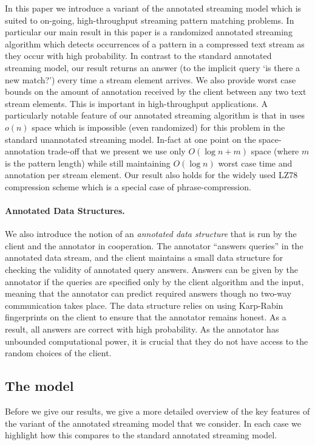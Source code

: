 In this paper we introduce a variant of the annotated streaming model which is suited to on-going, high-throughput streaming pattern matching problems. In particular our main result in this paper is a randomized annotated streaming algorithm which detects occurrences of a pattern in a compressed text stream as they occur with high probability. In contrast to the standard annotated streaming model, our result returns an answer (to the implicit query `is there a new match?') every time a stream element arrives. We also provide worst case bounds on the amount of annotation received by the client between any two text stream elements. This is important in high-throughput applications. A particularly notable feature of our annotated streaming algorithm is that in uses $o(n)$ space which is impossible (even randomized) for this problem in the standard unannotated streaming model. In-fact at one point on the space-annotation trade-off that we present we use only $O(\log n+m)$ space (where $m$ is the pattern length) while still maintaining $O(\log n)$ worst case time and annotation per stream element. Our result also holds for the widely used LZ78 compression scheme which is a special case of phrase-compression.

\paragraph{Annotated Data Structures. } We also introduce the notion of an \emph{annotated data structure} that is run by the client and the annotator in cooperation. The annotator ``answers queries'' in the annotated data stream, and the client maintains a small data structure for checking the validity of annotated query answers.
Answers can be given by the annotator if the queries are specified only by the client algorithm and the input, meaning that the annotator can predict required answers though no two-way communication takes place. %
The data structure relies on using Karp-Rabin fingerprints on the client to ensure that the annotator remains honest. As a result, all answers are correct with high probability. As the annotator has unbounded computational power, it is crucial that they do not have access to the random choices of the client.



\subsection{The model}
Before we give our results, we give a more detailed overview of the key features of the variant of the annotated streaming model that we consider. In each case we highlight how this compares to the standard annotated streaming model.


